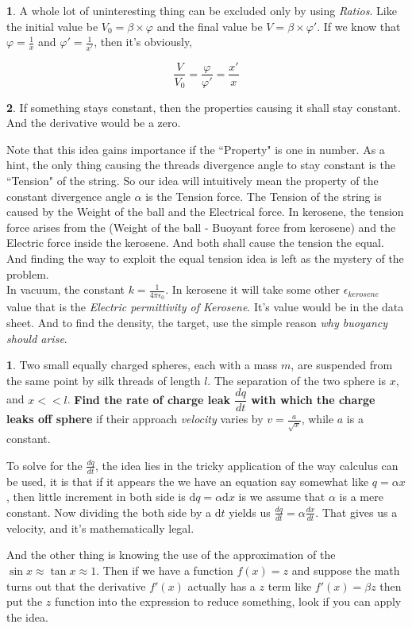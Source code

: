 \documentclass[11pt,a4paper,twocolumn]{article}
\theoremstyle{definition}
\theoremstyle{definition}
\newtheorem{pr}{ \framebox[0.05\textwidth]{Pr} }
\theoremstyle{definition}
\newtheorem{idea}{ \framebox[0.05\textwidth]{Idea} }
\theoremstyle{definition}
\begin{document}
\begin{idea}
A whole lot of uninteresting thing can be excluded only by using \emph{Ratios}. Like the initial value be $V_0 = \beta \times \varphi$ and the final value be $V = \beta \times \varphi'$. If we know that $\varphi = \frac{1}{x}$ and $\varphi'=\frac{1}{x'}$, then it's obviously, 

\[ \frac{V}{V_0} = \frac{\varphi}{\varphi'} = \frac{x'}{x} \]
\end{idea}

\begin{idea}
If something stays constant, then the properties causing it shall stay constant. And the derivative would be a zero.
\end{idea}

Note that this idea gains importance if the ``Property" is one in number. As a hint, the only thing causing the threads divergence angle to stay constant is the ``Tension" of the string. So our idea will intuitively mean the property of the constant divergence angle $\alpha$ is the Tension force. The Tension of the string is caused by the Weight of the ball and the Electrical force. In kerosene, the tension force arises from the (Weight of the ball - Buoyant force from kerosene) and the Electric force inside the kerosene. And both shall cause the tension the equal. And finding the way to exploit the equal tension idea is left as the mystery of the problem. \\

In vacuum, the constant $k = \frac{1}{4 \pi \epsilon _0} $. In kerosene it will take some other $ \epsilon_{kerosene}$ value that is the \emph{Electric permittivity of Kerosene}. It's value would be in the data sheet. And to find the density, the target, use the simple reason \emph{why buoyancy should arise}.

 


\begin{pr} \label{pr1}
Two small equally charged spheres, each with a mass $m$, are suspended from the same point by silk threads of length $l$. The separation of the two sphere is $x$, and $x < < l$. \textbf{Find the rate of charge leak $\dfrac{dq}{dt}$ with which the charge leaks off sphere} if their approach \emph{velocity} varies by $v=\frac{a}{\sqrt{x}}$, while $a$ is a constant.
\end{pr}
{\small
To solve for the $\frac{dq}{dt}$, the idea lies in the tricky application of the way calculus can be used, it is that if it appears the we have an equation say somewhat like $ q = \alpha x $, then little increment in both side is $ \mathrm{d}q = \alpha \mathrm{d}x $ is we assume that $\alpha$ is a mere constant. Now dividing the both side by a $\mathrm{d}t$ yields us $\frac{dq}{dt} = \alpha \frac{dx}{dt} $. That gives us a velocity, and it's mathematically legal. 

And the other thing is knowing the use of the approximation of the $\sin x \approx \tan x \approx 1 $. Then if we have a function $f(x) = z$ and suppose the math turns out that the derivative $f'(x)$ actually has a $z$ term like $ f'(x) = \beta z $ then put the $z$ function into the expression to reduce something, look if you can apply the idea.}
\end{document}
